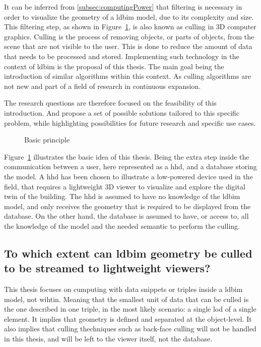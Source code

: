 It can be inferred from \ref{subsec:computingPower} that filtering is necessary in order to visualize the geometry of a \ac{ldbim} model, due to its complexity and size. This filtering step, as shown in Figure~\ref{fig:firstIdea}, is also known as culling in 3D computer graphics. Culling is the process of removing objects, or parts of objects, from the scene that are not visible to the user. This is done to reduce the amount of data that needs to be processed and stored. Implementing such technology in the context of \ac{ldbim} is the proposal of this thesis. The main goal being the introduction of similar algorithms within this context. As culling algorithms are not new and part of a field of research in continuous expansion.

The research questions are therefore focused on the feasibility of this introduction. And propose a set of possible solutions tailored to this specific problem, while highlighting possibilities for future research and specific use cases.

\begin{figure}[h]
    \centering
    
    \caption{Basic principle}
    \label{fig:firstIdea}
\end{figure}

Figure~\ref{fig:firstIdea} illustrates the basic idea of this thesis. Being the extra step inside the communication between a user, here represented as a \ac{hhd}, and a database storing the model. A \ac{hhd} has been chosen to illustrate a low-powered device used in the field, that requires a lightweight 3D viewer to visualize and explore the digital twin of the building. The \ac{hhd} is assumed to have no knowledge of the \ac{ldbim} model, and only receives the geometry that is required to be displayed from the database. On the other hand, the database is assumed to have, or access to, all the knowledge of the model and the needed semantic to perform the culling.

\subsection[Can \acs{ldbim} be culled?]{To which extent can \acs{ldbim} geometry be culled \\
    to be streamed to lightweight viewers?}
This thesis focuses on cumputing with data snippets or triples inside a \ac{ldbim} model, not wihtin. Meaning that the smallest unit of data that can be culled is the one described in one triple, in the most likely scenario: a single \ac{lod} of a single element. It implies that geometry is defined and separated at the object-level. It also implies that culling thechniques such as back-face culling will not be handled in this thesis, and will be left to the viewer itself, not the database.

